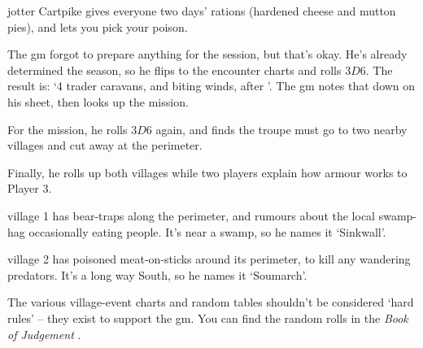 \begin{multicols}{2}
{\begin{description}
    \Gls{jotter} Cartpike gives everyone two days' rations (hardened cheese and mutton pies), and lets you pick your poison.
  \end{description}

}{
  The \gls{gm} forgot to prepare anything for the session, but that's okay.
  He's already determined the season, so he flips to the encounter charts and rolls $3D6$.
  The result is: `4 trader caravans, and biting winds, after '.
  The \gls{gm} notes that down on his sheet, then looks up the mission.

  For the mission, he rolls $3D6$ again, and finds the troupe must go to two nearby \glspl{village} and cut away at the perimeter.

  Finally, he rolls up both \glspl{village} while two players explain how armour works to Player 3.

  \Gls{village} 1 has bear-traps along the perimeter, and rumours about the local swamp-hag occasionally eating people.
  It's near a swamp, so he names it `Sinkwall'.

  \Gls{village} 2 has poisoned meat-on-sticks around its perimeter, to kill any wandering predators.
  It's a long way South, so he names it `Soumarch'.

  The various \gls{village}-event charts and random tables shouldn't be considered `hard rules' -- they exist to support the \gls{gm}.
  You can find the random rolls in the \textit{Book of Judgement}%
  \iftoggle{judgement}{, \autoref{encounters}, \autopageref{encounters}}{}.
}

\end{multicols}
